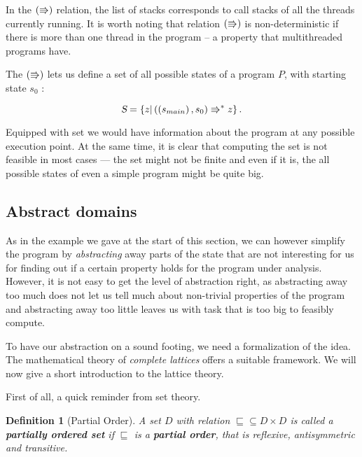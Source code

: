 \documentclass[..thesis.tex]{subfiles}
\newtheorem{defin}{Definition}[section]
\begin{document}
In the $\left( \Rrightarrow \right)$ relation, the list of stacks corresponds to call stacks of all the threads currently running.
It is worth noting that relation $\left( \Rrightarrow \right)$ is non-deterministic if there is more than one thread in the program -- a property that multithreaded programs have.

The $\left( \Rrightarrow \right)$ lets us define a set of all possible states of a program $P$, with starting state $s_0$ :

\begin{equation*}
\textsl{S} = \left\lbrace  z | \left( \left( s_{main} \right), s_0 \right) \Rrightarrow^{\ast} z \right\rbrace \text{.}
\end{equation*}



Equipped with set \allstates we would have information about the program at any possible execution point. At the same time,
 it is clear that computing the set \allstates is not feasible in most cases --- the set might not be finite and even if it is,
 the all possible states of even a simple program might be quite big.

\subsection{Abstract domains}

As in the example we gave at the start of this section, we can however simplify the program by \textit{abstracting} away parts
of the state that are not interesting for us for finding out if a certain property holds for the program under analysis. 
However, it is not easy to get the level of abstraction right, as abstracting away too much does not let us tell much about non-trivial properties
of the program and abstracting away too little leaves us with task that is too big to feasibly compute.


To have our abstraction on a sound footing, we need a formalization of the idea.
 The mathematical theory of \textit{complete lattices} offers a suitable framework.
 We will now give a short introduction to the lattice theory.


First of all, a quick reminder from set theory.

\begin{defin}[Partial Order]
A set $D$ with relation $\sqsubseteq \subseteq D \times D$ is called a \textbf{partially ordered set} if $\sqsubseteq$ 
is a \textbf{partial order}, that is reflexive, antisymmetric and transitive.
\end{defin}
\end{document}

